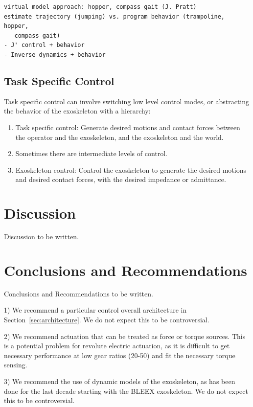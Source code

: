 \documentclass[letterpaper,12pt,fullpage]{article}
\begin{document}
\begin{verbatim}
virtual model approach: hopper, compass gait (J. Pratt)
estimate trajectory (jumping) vs. program behavior (trampoline, hopper,
   compass gait)
- J' control + behavior
- Inverse dynamics + behavior
\end{verbatim}

\subsection{Task Specific Control}

Task specific control can involve switching low level control modes, or abstracting
the behavior of the exoskeleton with a hierarchy:
\begin{enumerate}
\item
Task specific control: Generate desired motions and contact forces between
the operator and the exoskeleton, and the exoskeleton and the world.
\item
Sometimes there are intermediate levels of control.
\item
Exoskeleton control: Control the exoskeleton to generate the desired motions and
desired contact forces, with the desired impedance or admittance.
\end{enumerate}

\section{Discussion}

Discussion to be written.

\section{Conclusions and Recommendations}

Conclusions and Recommendations to be written.

1) We recommend a particular control 
overall architecture in Section~\ref{sec:architecture}.
We do not expect this to be controversial.

2) We recommend actuation that can be treated as force or torque sources.
This is a potential problem for revolute electric actuation, as it
is difficult to get necessary performance at low gear ratios (20-50)
and fit the necessary torque sensing.

3) We recommend the use of dynamic models of the exoskeleton, as has been done
for the last decade starting with the BLEEX exoskeleton.
We do not expect this to be controversial.
\end{document}
